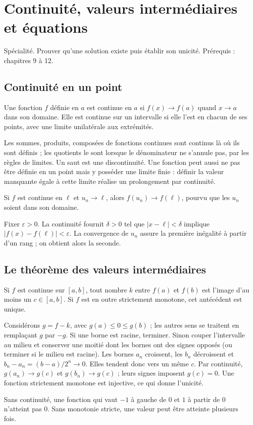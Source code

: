 \documentclass[../cours_tle.tex]{subfiles}
\begin{document}
\setcounter{chapter}{12}
\chapter{Continuité, valeurs intermédiaires et équations}
\label{ch:13}
\begin{objectif}
Spécialité. Prouver qu'une solution existe puis établir son unicité. Prérequis : chapitres 9 à 12.
\end{objectif}
\section{Continuité en un point}
\begin{definition}
Une fonction $f$ définie en $a$ est continue en $a$ si $f(x)\to f(a)$ quand $x\to a$ dans son domaine. Elle est continue sur un intervalle si elle l'est en chacun de ses points, avec une limite unilatérale aux extrémités.
\end{definition}
Les sommes, produits, composées de fonctions continues sont continus là où ils sont définis ; les quotients le sont lorsque le dénominateur ne s'annule pas, par les règles de limites.
Un saut est une discontinuité. Une fonction peut aussi ne pas être définie en un point mais y posséder une limite finie : définir la valeur manquante égale à cette limite réalise un prolongement par continuité.
\begin{theoreme}
Si $f$ est continue en $\ell$ et $u_n\to\ell$, alors $f(u_n)\to f(\ell)$, pourvu que les $u_n$ soient dans son domaine.
\end{theoreme}
\begin{demonstration}
Fixer $\varepsilon>0$. La continuité fournit $\delta>0$ tel que $|x-\ell|<\delta$ implique $|f(x)-f(\ell)|<\varepsilon$. La convergence de $u_n$ assure la première inégalité à partir d'un rang ; on obtient alors la seconde.
\end{demonstration}
\section{Le théorème des valeurs intermédiaires}
\begin{theoreme}
Si $f$ est continue sur $[a,b]$, tout nombre $k$ entre $f(a)$ et $f(b)$ est l'image d'au moins un $c\in[a,b]$.
Si $f$ est en outre strictement monotone, cet antécédent est unique.
\end{theoreme}
\begin{demonstration}
Considérons $g=f-k$, avec $g(a)\le0\le g(b)$ ; les autres sens se traitent en remplaçant $g$ par $-g$. Si une borne est racine, terminer. Sinon couper l'intervalle au milieu et conserver une moitié dont les bornes ont des signes opposés (ou terminer si le milieu est racine).
Les bornes $a_n$ croissent, les $b_n$ décroissent et $b_n-a_n=(b-a)/2^n\to0$. Elles tendent donc vers un même $c$. Par continuité, $g(a_n)\to g(c)$ et $g(b_n)\to g(c)$ ; leurs signes imposent $g(c)=0$.
Une fonction strictement monotone est injective, ce qui donne l'unicité.
\end{demonstration}
Sans continuité, une fonction qui vaut $-1$ à gauche de $0$ et $1$ à partir de $0$ n'atteint pas $0$. Sans monotonie stricte, une valeur peut être atteinte plusieurs fois.
\end{document}
